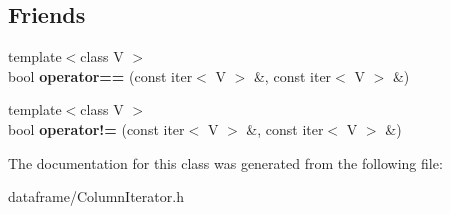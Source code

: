 \subsection*{Friends}
\begin{DoxyCompactItemize}
\item 
\mbox{\label{classDataFrame_1_1ColumnIterator_a9e9de084e6237f0757aff0f5734d5b61}} 
{\footnotesize template$<$class V $>$ }\\bool {\bfseries operator==} (const iter$<$ V $>$ \&, const iter$<$ V $>$ \&)
\item 
\mbox{\label{classDataFrame_1_1ColumnIterator_aa108d2c38bd5458546a49474e799e6a5}} 
{\footnotesize template$<$class V $>$ }\\bool {\bfseries operator!=} (const iter$<$ V $>$ \&, const iter$<$ V $>$ \&)
\end{DoxyCompactItemize}


The documentation for this class was generated from the following file\+:\begin{DoxyCompactItemize}
\item 
dataframe/Column\+Iterator.\+h\end{DoxyCompactItemize}
